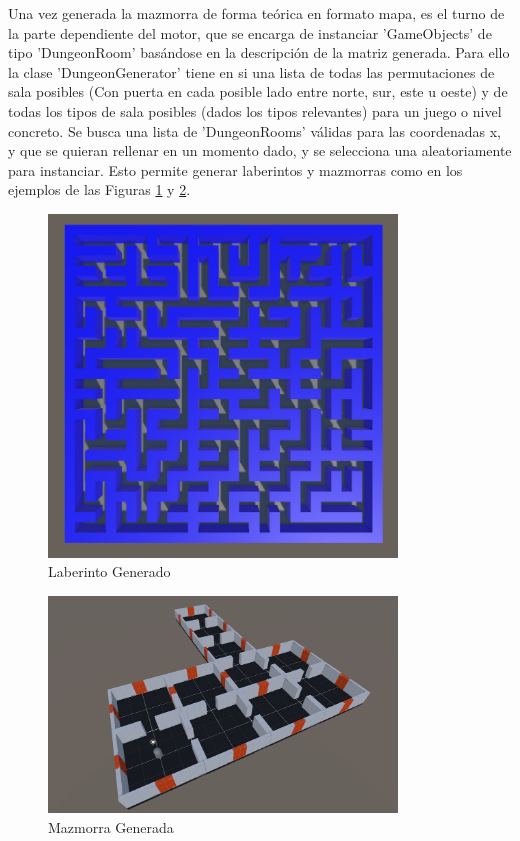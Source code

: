 Una vez generada la mazmorra de forma teórica en formato mapa, es el turno de la parte dependiente del motor, que se encarga de instanciar 'GameObjects' de tipo 'DungeonRoom' 
basándose en la descripción de la matriz generada. Para ello la clase 'DungeonGenerator' tiene en si una lista de todas las permutaciones de sala posibles (Con puerta en cada 
posible lado entre norte, sur, este u oeste) y de todas los tipos de sala posibles (dados los tipos relevantes) para un juego o nivel concreto. Se busca una lista de 
'DungeonRooms' válidas para las coordenadas x, y que se quieran rellenar en un momento dado, y se selecciona una aleatoriamente para instanciar. Esto permite generar laberintos
y mazmorras como en los ejemplos de las Figuras \ref{fig:labyrinthExample} y \ref{fig:dungeonExample}.

\begin{figure}[H]
  \centering
    \includegraphics[width=350px,clip=true]{labyrinth_example.png}
  \caption{Laberinto Generado}
  \label{fig:labyrinthExample}
\end{figure}

\begin{figure}[H]
  \centering
    \includegraphics[width=350px,clip=true]{DungeonExample.png}
  \caption{Mazmorra Generada}
  \label{fig:dungeonExample}
\end{figure}

